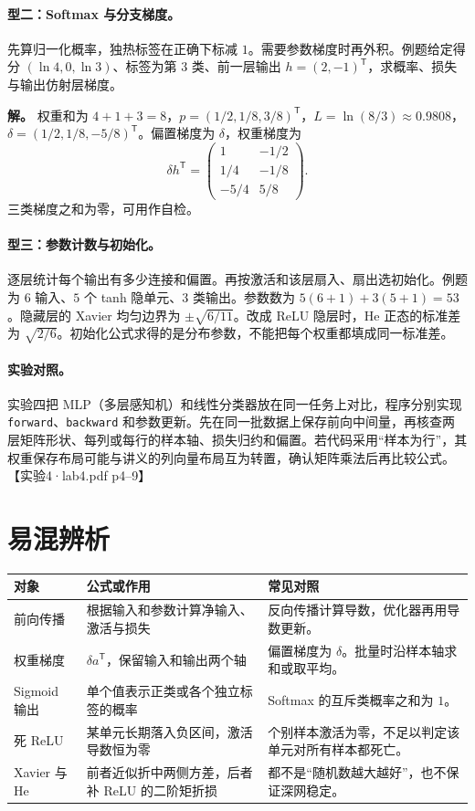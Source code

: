 \documentclass[UTF8,a4paper,zihao=-4,fontset=fandol]{ctexrep}
\begin{document}
\paragraph{型二：Softmax 与分支梯度。}
先算归一化概率，独热标签在正确下标减 $1$。需要参数梯度时再外积。例题给定得分 $(\ln4,0,\ln3)$、标签为第 $3$ 类、前一层输出 $h=(2,-1)^{\mathsf T}$，求概率、损失与输出仿射层梯度。

\textbf{解。} 权重和为 $4+1+3=8$，$p=(1/2,1/8,3/8)^{\mathsf T}$，$L=\ln(8/3)\approx0.9808$，$\delta=(1/2,1/8,-5/8)^{\mathsf T}$。偏置梯度为 $\delta$，权重梯度为
\[
 \delta h^{\mathsf T}
 =\begin{pmatrix}1&-1/2\\1/4&-1/8\\-5/4&5/8\end{pmatrix}.
\]
三类梯度之和为零，可用作自检。

\paragraph{型三：参数计数与初始化。}
逐层统计每个输出有多少连接和偏置。再按激活和该层扇入、扇出选初始化。例题为 $6$ 输入、$5$ 个 tanh 隐单元、$3$ 类输出。参数数为 $5(6+1)+3(5+1)=53$。隐藏层的 Xavier 均匀边界为 $\pm\sqrt{6/11}$。改成 ReLU 隐层时，He 正态的标准差为 $\sqrt{2/6}$。初始化公式求得的是分布参数，不能把每个权重都填成同一标准差。

\paragraph{实验对照。}
实验四把 MLP（多层感知机）和线性分类器放在同一任务上对比，程序分别实现 \texttt{forward}、\texttt{backward} 和参数更新。先在同一批数据上保存前向中间量，再核查两层矩阵形状、每列或每行的样本轴、损失归约和偏置。若代码采用“样本为行”，其权重保存布局可能与讲义的列向量布局互为转置，确认矩阵乘法后再比较公式。【实验4·lab4.pdf p4--9】

\section{易混辨析}

\begin{center}
\begin{tabularx}{\linewidth}{@{}lXX@{}}
\toprule
对象 & 公式或作用 & 常见对照\\
\midrule
前向传播 & 根据输入和参数计算净输入、激活与损失 & 反向传播计算导数，优化器再用导数更新。\\
权重梯度 & $\delta a^{\mathsf T}$，保留输入和输出两个轴 & 偏置梯度为 $\delta$。批量时沿样本轴求和或取平均。\\
Sigmoid 输出 & 单个值表示正类或各个独立标签的概率 & Softmax 的互斥类概率之和为 $1$。\\
死 ReLU & 某单元长期落入负区间，激活导数恒为零 & 个别样本激活为零，不足以判定该单元对所有样本都死亡。\\
Xavier 与 He & 前者近似折中两侧方差，后者补 ReLU 的二阶矩折损 & 都不是“随机数越大越好”，也不保证深网稳定。\\
\bottomrule
\end{tabularx}
\end{center}
\end{document}
